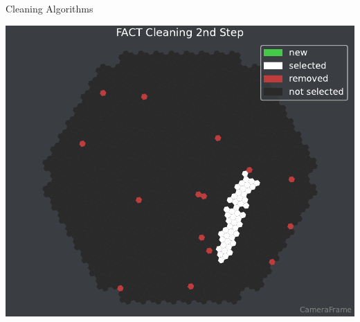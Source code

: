 \begin{frame}[t]{Cleaning Algorithms}
{\begin{overlayarea}{0.36\textwidth}{3.5cm}
{        \includegraphics[width=\textwidth]{plots/cleaner_steps/dark/fact_2.pdf}
      }
\end{overlayarea}}
\end{frame}
